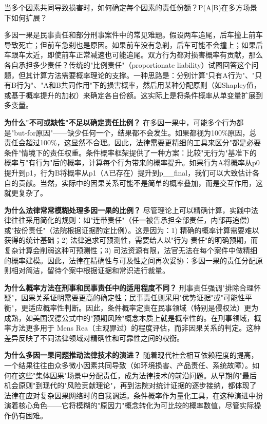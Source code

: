 \documentclass[../main.tex]{subfiles}
\begin{document}
	\begin{questionbox}

		当多个因素共同导致损害时，如何确定每个因素的责任份额？P(A|B)在多方场景下如何扩展？

	\end{questionbox}
	
	多因一果是民事责任和部分刑事案件中的常见难题。假设两车追尾，后车撞上前车导致死亡；但前车急刹也是原因。如果前车没有急刹，后车可能不会撞上；如果后车跟车太近，即使前车正常减速也可能追尾。双方行为都对损害概率有贡献，那么各自承担多少责任？传统的"比例责任"（proportionate liability）试图回答这个问题，但其计算方法需要概率理论的支撑。一种思路是：分别计算"只有A行为"、"只有B行为"、"A和B共同作用"下的损害概率，然后用某种分配原则（如Shapley值，或基于概率提升的加权）来确定各自份额。这实际上是将条件概率从单变量扩展到多变量。
	
	\textbf{为什么"不可或缺性"不足以确定责任比例？} 在多因一果中，可能多个行为都是"but-for原因"——缺少任何一个，结果都不会发生。如果都视为100\%原因，总责任会超过100\%，这显然不合理。因此，法律需要更精细的工具来区分"都是必要条件"情境下的责任权重。条件概率框架提供了一种方案：比较"无行为"基准下的概率与"有行为"后的概率，计算每个行为带来的概率提升。如果行为A将概率从p0提升到p1，行为B将概率从p1（A已存在）提升到p\_{\_final}，我们可以大致估计各自的贡献。当然，实际中的因果关系可能不是简单的概率叠加，而是交互作用，这就更复杂了。
	
	\textbf{为什么法律常常模糊处理多因一果的比例？} 尽管理论上可以精确计算，实践中法律往往采用简化的规则：如"连带责任"（任一被告承担全部责任，内部再追偿）或"按份责任"（法院根据证据酌定比例）。这是因为：1) 精确的概率计算需要难以获得的统计基础；2) 法律追求可预测性，需要给人以"行为-责任"的明确预期，而复杂计算会削弱这种可预测性；3) 司法资源有限，法官无法在每个案件中做精细的概率建模。因此，法律在精确性与可及性之间再次妥协：多因一果的责任分配原则相对简洁，留待个案中根据证据和常识进行裁量。
	
	\textbf{为什么概率方法在刑事和民事责任中的适用程度不同？} 刑事责任强调"排除合理怀疑"，因果关系证明需要更高的确定性；民事责任则采用"优势证据"或"可能性平衡"，更适应概率性判断。因此，条件概率定责在民事领域（特别是侵权法）更为成熟，如美国汉德公式中的"预期风险"概念本质上就是概率性的。在刑事领域，概率方法更多用于 Mens Rea（主观罪过）的程度评估，而非因果关系的判定。这种差异反映了不同法律领域对精确性和可靠性之间的权衡。
	
	\textbf{为什么多因一果问题推动法律技术的演进？} 随着现代社会相互依赖程度的提高，一个结果往往由众多微小因素共同导致（如环境损害、产品责任、系统故障）。如何在这些"集体因果"场景中分配责任，成为法律技术的前沿问题。从早期的"最后机会原则"到现代的"风险贡献理论"，再到法院对统计证据的逐步接纳，都体现了法律在应对复杂因果网络时的自我调适。条件概率作为量化工具，在这种演进中扮演着核心角色——它将模糊的"原因力"概念转化为可比较的概率数值，尽管实际操作仍有困难。
	
\end{document}
